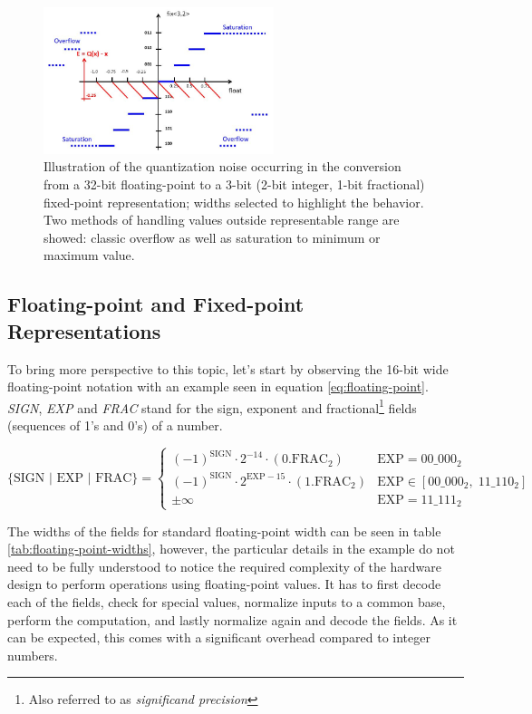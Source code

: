 \begin{figure}[hpt!]
  \centering
  \includegraphics[trim={0cm 0cm 0cm 0cm}, width=0.6\textwidth, center]{models/float_to_fixed.jpg}
  \caption{Illustration of the quantization noise occurring in the conversion from a 32-bit floating-point to a 3-bit (2-bit integer, 1-bit fractional) fixed-point representation; widths selected to highlight the behavior. Two methods of handling values outside representable range are showed: classic overflow as well as saturation to minimum or maximum value.}
  \label{fig:float-to-fixed}
\end{figure}

\subsection{Floating-point and Fixed-point Representations}
To bring more perspective to this topic, let's start by observing the 16-bit wide floating-point notation with an example seen in equation \ref{eq:floating-point}. \textit{SIGN}, \textit{EXP} and \textit{FRAC} stand for the sign, exponent and fractional\footnote{Also referred to as \textit{significand precision}} fields (sequences of 1's and 0's) of a number.

\begin{equation}\label{eq:floating-point}
  \{\text{SIGN | EXP | FRAC}\} = 
  \begin{cases}
    (-1)^{\text{SIGN}} \cdot 2^{-14} \cdot (0.\text{FRAC}_2) & \text{EXP} = 00\_000_2 \\
    (-1)^{\text{SIGN}} \cdot 2^{\text{EXP}-15} \cdot (1.\text{FRAC}_2) & \text{EXP} \in [00\_000_2,\; 11\_110_2] \\
    \pm \infty & \text{EXP} = 11\_111_2
  \end{cases}
\end{equation}

The widths of the fields for standard floating-point width can be seen in table \ref{tab:floating-point-widths}, however, the particular details in the example do not need to be fully understood to notice the required complexity of the hardware design to perform operations using floating-point values. It has to first decode each of the fields, check for special values, normalize inputs to a common base, perform the computation, and lastly normalize again and decode the fields. As it can be expected, this comes with a significant overhead compared to integer numbers.

